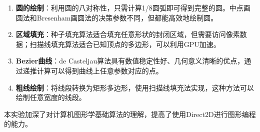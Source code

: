 \documentclass[12pt,a4paper]{article}
\begin{document}
\begin{tcolorbox}
\begin{enumerate}
    \item \textbf{圆的绘制}：利用圆的八对称性，只需计算1/8圆弧即可得到完整的圆。中点画圆法和Bresenham画圆法的决策参数不同，但都能高效地绘制圆。
    
    \item \textbf{区域填充}：种子填充算法适合填充任意形状的封闭区域，但需要访问像素数据；扫描线填充算法适合已知顶点的多边形，可以利用GPU加速。
    
    \item \textbf{Bezier曲线}：de Casteljau算法具有数值稳定性好、几何意义清晰的优点，通过递推计算可以得到曲线上任意参数对应的点。
    
    \item \textbf{粗线绘制}：将线段转换为矩形多边形，使用扫描线填充法实现，这种方法可以绘制任意宽度的线段。
\end{enumerate}

本实验加深了对计算机图形学基础算法的理解，提高了使用Direct2D进行图形编程的能力。
\end{tcolorbox}
\end{document}
